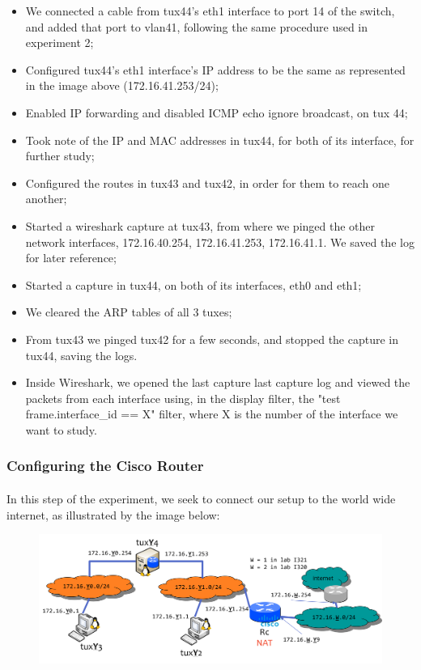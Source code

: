 \documentclass[11pt]{article}
\begin{document}
\begin{itemize}
    \item We connected a cable from tux44's eth1 interface to port 14 of the switch, and added that port to vlan41, following the same procedure used in experiment 2;
    \item Configured tux44's eth1 interface's IP address to be the same as represented in the image above (172.16.41.253/24);
    \item Enabled IP forwarding and disabled ICMP echo ignore broadcast, on tux 44;
    \item Took note of the IP and MAC addresses in tux44, for both of its interface, for further study;
    \item Configured the routes in tux43 and tux42, in order for them to reach one another;
    \item Started a wireshark capture at tux43, from where we pinged the other network interfaces, 172.16.40.254, 172.16.41.253, 172.16.41.1. We saved the log for later reference;
    \item Started a capture in tux44, on both of its interfaces, eth0 and eth1;
    \item We cleared the ARP tables of all 3 tuxes;
    \item From tux43 we pinged tux42 for a few seconds, and stopped the capture in tux44, saving the logs.
    \item Inside Wireshark, we opened the last capture last capture log and viewed the packets from each interface using, in the display filter, the "test frame.interface\_id == X" filter, where X is the number of the interface we want to study.
\end{itemize}

\subsubsection*{Configuring the Cisco Router}

\paragraph{}In this step of the experiment, we seek to connect our setup to the world wide internet, as illustrated by the image below:

\begin{figure}[h]
    \includegraphics[scale=1]{images/net-exp4-2.png}
    \centering
\end{figure}
\end{document}
